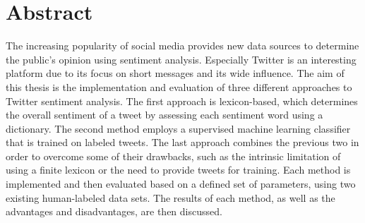 \chapter*{Abstract}

\iffalse

\selectlanguage{english}
Questions:
\begin{itemize}
\item How much explanation of the methods? --> nicht so viel, so wie ich es gemacht habe
\item Should extraction of tweets be part of the abstract?
\item Should the results be part of the abstract? --> rauslassen, eher Motivation --> contributions Werbung nicht Kurzzusammenfassung,Ziele
\item Motivation/introduction?
Ziele: Was genau soll ermittelt werden, was machen mit diesen Ergebnissen --> results can be used to implement means of evaluating --> Praxisbezug, ein Satz reicht
\end{itemize}
\fi

The increasing popularity of social media provides new data sources to determine the public's opinion using sentiment analysis. Especially Twitter is an interesting platform due to its focus on short messages and its wide influence. The aim of this thesis is the implementation and evaluation of three different approaches to Twitter sentiment analysis. The first approach is lexicon-based, which determines the overall sentiment of a tweet by assessing each sentiment word using a dictionary. The second method employs a supervised machine learning classifier that is trained on labeled tweets. The last approach combines the previous two in order to overcome some of their drawbacks, such as the intrinsic limitation of using a finite lexicon or the need to provide tweets for training. Each method is implemented and then evaluated based on a defined set of parameters, using two existing human-labeled data sets. The results of each method, as well as the advantages and disadvantages, are then discussed.


